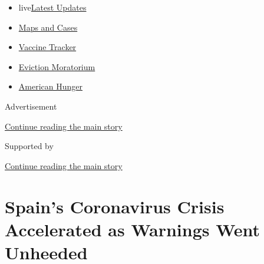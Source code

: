 \begin{itemize}
\tightlist
\item
  live\href{https://www.nytimes3xbfgragh.onion/2020/09/08/world/covid-19-coronavirus.html?name=styln-coronavirus-national\&region=TOP_BANNER\&block=storyline_menu_recirc\&action=click\&pgtype=Article\&impression_id=558520d1-f1c9-11ea-8e0c-1398ceb9913f\&variant=undefined}{Latest
  Updates}
\item
  \href{https://www.nytimes3xbfgragh.onion/interactive/2020/us/coronavirus-us-cases.html?name=styln-coronavirus-national\&region=TOP_BANNER\&block=storyline_menu_recirc\&action=click\&pgtype=Article\&impression_id=558547e0-f1c9-11ea-8e0c-1398ceb9913f\&variant=undefined}{Maps
  and Cases}
\item
  \href{https://www.nytimes3xbfgragh.onion/interactive/2020/science/coronavirus-vaccine-tracker.html?name=styln-coronavirus-national\&region=TOP_BANNER\&block=storyline_menu_recirc\&action=click\&pgtype=Article\&impression_id=558547e1-f1c9-11ea-8e0c-1398ceb9913f\&variant=undefined}{Vaccine
  Tracker}
\item
  \href{https://www.nytimes3xbfgragh.onion/2020/09/02/your-money/eviction-moratorium-covid.html?name=styln-coronavirus-national\&region=TOP_BANNER\&block=storyline_menu_recirc\&action=click\&pgtype=Article\&impression_id=558547e2-f1c9-11ea-8e0c-1398ceb9913f\&variant=undefined}{Eviction
  Moratorium}
\item
  \href{https://www.nytimes3xbfgragh.onion/interactive/2020/09/02/magazine/food-insecurity-hunger-us.html?name=styln-coronavirus-national\&region=TOP_BANNER\&block=storyline_menu_recirc\&action=click\&pgtype=Article\&impression_id=558547e3-f1c9-11ea-8e0c-1398ceb9913f\&variant=undefined}{American
  Hunger}
\end{itemize}

Advertisement

\protect\hyperlink{after-top}{Continue reading the main story}

Supported by

\protect\hyperlink{after-sponsor}{Continue reading the main story}

\hypertarget{spains-coronavirus-crisis-accelerated-as-warnings-went-unheeded}{%
\section{Spain's Coronavirus Crisis Accelerated as Warnings Went
Unheeded}\label{spains-coronavirus-crisis-accelerated-as-warnings-went-unheeded}}

